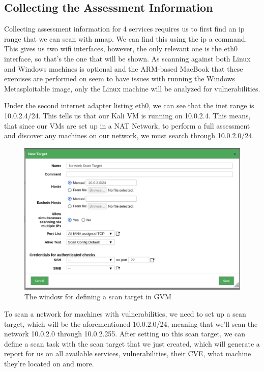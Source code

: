 \subsection{Collecting the Assessment Information}
Collecting assessment information for 4 services requires us to first find an ip range that we can scan with nmap. We can find this using the ip a command. This gives us two wifi interfaces, however, the only relevant one is the eth0 interface, so that's the one that will be shown. As scanning against both Linux and Windows machines is optional and the ARM-based MacBook that these exercises are performed on seem to have issues with running the Windows Metasploitable image, only the Linux machine will be analyzed for vulnerabilities.


Under the second internet adapter listing eth0, we can see that the inet range is 10.0.2.4/24. This tells us that our Kali VM is running on 10.0.2.4. This means, that since our VMs are set up in a NAT Network, to perform a full assessment and discover any machines on our network, we must search through 10.0.2.0/24.

\begin{figure}[H]
    \caption{The window for defining a scan target in GVM}
    \begin{center}
        \includegraphics[width=\textwidth]{Outputs/E03/gvm-scan-target.png}
    \end{center}
\end{figure}

To scan a network for machines with vulnerabilities, we need to set up a scan target, which will be the aforementioned 10.0.2.0/24, meaning that we'll scan the network 10.0.2.0 through 10.0.2.255. After setting uo this scan target, we can define a scan task with the scan target that we just created, which will generate a report for us on all available services, vulnerabilities, their CVE, what machine they're located on and more.

